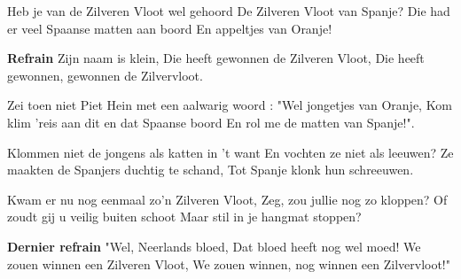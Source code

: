 \footnotemark [
ititle={Zilvervloot, de}]


\beginverse
Heb je van de Zilveren Vloot wel gehoord
De Zilveren Vloot van Spanje?
Die had er veel Spaanse matten aan boord
En appeltjes van Oranje!
\endverse

\beginchorus
\textbf{Refrain}
Zijn naam is klein,
Die heeft gewonnen de Zilveren Vloot,
Die heeft gewonnen, gewonnen de Zilvervloot.
\endchorus

\beginverse
Zei toen niet Piet Hein met een aalwarig woord :
"Wel jongetjes van Oranje,
Kom klim 'reis aan dit en dat Spaanse boord
En rol me de matten van Spanje!".
\endverse

\beginverse
Klommen niet de jongens als katten in 't want
En vochten ze niet als leeuwen?
Ze maakten de Spanjers duchtig te schand,
Tot Spanje klonk hun schreeuwen.
\endverse

\beginverse
Kwam er nu nog eenmaal zo'n Zilveren Vloot,
Zeg, zou jullie nog zo kloppen?
Of zoudt gij u veilig buiten schoot
Maar stil in je hangmat stoppen?
\endverse

\beginchorus
\textbf{Dernier refrain}
"Wel, Neerlands bloed,
Dat bloed heeft nog wel moed!
We zouen winnen een Zilveren Vloot,
We zouen winnen, nog winnen een Zilvervloot!"
\endchorus
\endsong